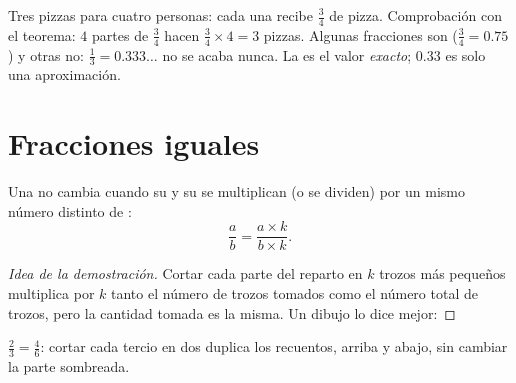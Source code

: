 \begin{example}\label{ex:g6:fractions:pizzas}
Tres pizzas para cuatro personas: cada una recibe $\frac34$ de pizza.
Comprobación con el teorema: $4$ partes de $\frac34$ hacen
$\frac34 \times 4 = 3$ pizzas. Algunas fracciones son 
($\frac34 = 0.75$) y otras no: $\frac13 = 0.333\dots$ no se acaba nunca.
La  es el valor \emph{exacto}; $0.33$ es solo una aproximación.
\end{example}

\section{Fracciones iguales}

\begin{proposition}\label{prop:g6:fractions:equal}
Una  no cambia cuando su  y su  se
multiplican (o se dividen) por un mismo número distinto de :
\[
\frac{a}{b} = \frac{a \times k}{b \times k} .
\]
\end{proposition}

\begin{proof}[Idea de la demostración]
Cortar cada parte del reparto en $k$ trozos más pequeños multiplica por $k$ tanto
el número de trozos tomados como el número total de trozos, pero
la cantidad tomada es la misma. Un dibujo lo dice mejor:
\end{proof}

\begin{omfigure}

{\small $\frac23 = \frac46$: cortar cada tercio en dos duplica los
recuentos, arriba y abajo, sin cambiar la parte sombreada.}
\end{omfigure}

